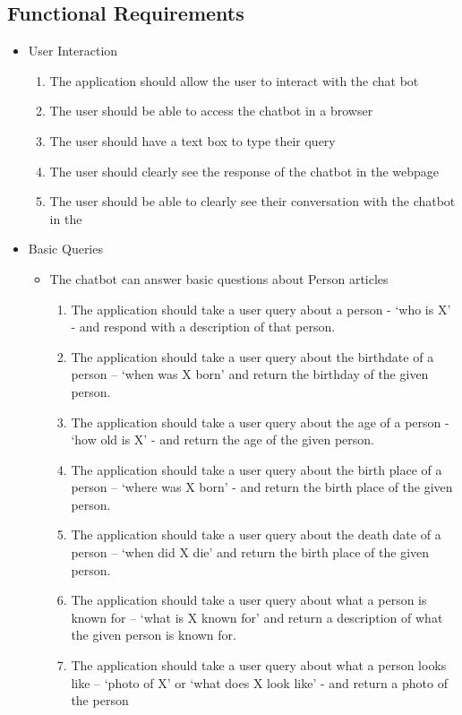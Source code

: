 \subsection{Functional Requirements}

\begin{itemize}
	\item User Interaction
	\begin{enumerate}[label*=F\arabic*.]
		\item The application should allow the user to interact with the chat bot
		\item The user should be able to access the chatbot in a browser
		\item The user should have a text box to type their query
		\item The user should clearly see the response of the chatbot in the webpage
		\item The user should be able to clearly see their conversation with the chatbot in the 
	\end{enumerate}
	\item Basic Queries
	\begin{itemize}
		\item The chatbot can answer basic questions about Person articles
		\begin{enumerate}[resume*]
			\item The application should take a user query about a person - ‘who is X’ - and respond with a description of that person.
			\item The application should take a user query about the birthdate of a person – ‘when was X born’ and return the birthday of the given person.
			\item The application should take a user query about the age of a person - ‘how old is X’ - and return the age of the given person.
			\item The application should take a user query about the birth place of a person – ‘where was X born’ -  and return the birth place of the given person. 
			\item The application should take a user query about the death date of a person – ‘when did X die’ and return the birth place of the given person. 
			\item The application should take a user query about what a person is known for – ‘what is X known for’ and return a description of what the given person is known for.
			\item The application should take a user query about what a person looks like – ‘photo of X’ or ‘what does X look like’ - and return a photo of the person

\end{enumerate}
\end{itemize}
\end{itemize}
